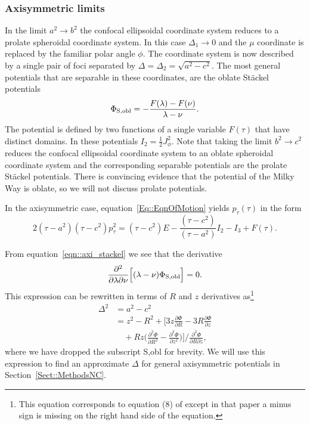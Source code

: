 \documentclass[useAMS,usenatbib,fleqn,a4paper]{mn2e}
\begin{document}
\subsubsection{Axisymmetric limits}

In the limit $a^2\rightarrow b^2$ the confocal ellipsoidal coordinate system
reduces to a prolate spheroidal coordinate system. In this case $\Delta_1\rightarrow0$ and the $\mu$
coordinate is replaced by the familiar polar angle $\phi$. The coordinate system is now described by a single pair of foci separated by $\Delta=\Delta_2=\sqrt{a^2-c^2}$. The most general
potentials that are separable  in these coordinates, are the oblate St\"ackel potentials
\begin{equation}
\Phi_{\rm S,obl} = -\frac{F(\lambda)-F(\nu)}{\lambda-\nu}.
\label{eqn::axi_stackel}
\end{equation}
 The potential is defined by two functions of a single variable $F(\tau)$
that have distinct domains. In these potentials $I_2=\frac{1}{2}J_\phi^2$.
Note that taking the limit $b^2 \rightarrow c^2$ reduces the confocal
ellipsoidal coordinate system to an oblate spheroidal coordinate
system and the corresponding separable potentials are the prolate St\"ackel
potentials. There is convincing evidence that the potential of the Milky Way
is oblate, so we will not discuss prolate potentials.

In the axisymmetric case,
equation~\eqref{Eq::EqnOfMotion} yields $p_\tau(\tau)$ in the form
\begin{equation}
2(\tau-a^2)(\tau-c^2)p_\tau^2=(\tau-c^2)E-\frac{(\tau-c^2)}{(\tau-a^2)}I_2-I_3+F(\tau).
\label{Eq::EqnOfMotionAxi}
\end{equation}

From equation~\eqref{eqn::axi_stackel} we see that the derivative
\[
\frac{\partial^2}{\partial\lambda\partial\nu}\Big[(\lambda-\nu)\Phi_{\rm S,obl}\Big]=0.
\]
This expression can be rewritten in terms of $R$ and $z$ derivatives
as\footnote{This equation corresponds to equation (8) of \cite{Sanders2012a} except in that paper a minus sign is
missing on the right hand side of the equation.}
\begin{equation}
\begin{split}
\Delta^2 &= a^2-c^2 \\
&= z^2-R^2+\Big[3z\frac{\partial \Phi}{\partial R}
-3R\frac{\partial \Phi}{\partial z}\\
&\quad+Rz\Big(\frac{\partial^2 \Phi}{\partial R^2}-\frac{\partial^2 \Phi}{\partial
z^2}\Big)\Big]\bigg/\frac{\partial^2 \Phi}{\partial R\partial z},
\end{split}
\label{DeltaGuess}
\end{equation}
where we have dropped the subscript S,obl for brevity. We will use this expression to find an approximate $\Delta$ for general axisymmetric potentials in Section~\ref{Sect::MethodsNC}.
\end{document}
